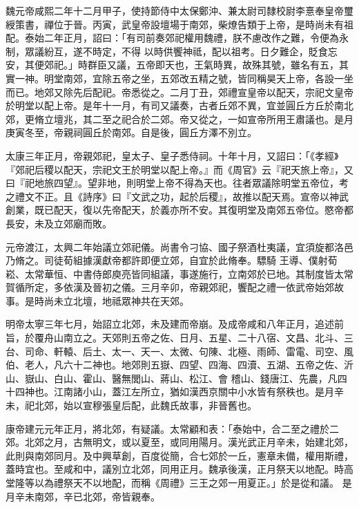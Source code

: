 \begin{pinyinscope}
 魏元帝咸熙二年十二月甲子，使持節侍中太保鄭沖、兼太尉司隸校尉李憙奉皇帝璽綬策書，禪位于晉。丙寅，武皇帝設壇場于南郊，柴燎告類于上帝，是時尚未有祖配。泰始二年正月，詔曰：「有司前奏郊祀權用魏禮，朕不慮改作之難，令便為永制，眾議紛互，遂不時定，不得
 以時供饗神祗，配以祖考。日夕難企，貶食忘安，其便郊祀。」時群臣又議，五帝即天也，王氣時異，故殊其號，雖名有五，其實一神。明堂南郊，宜除五帝之坐，五郊改五精之號，皆同稱昊天上帝，各設一坐而已。地郊又除先后配祀。帝悉從之。二月丁丑，郊禮宣皇帝以配天，宗祀文皇帝於明堂以配上帝。是年十一月，有司又議奏，古者丘郊不異，宜並圓丘方丘於南北郊，更脩立壇兆，其二至之祀合於二郊。帝又從之，一如宣帝所用王肅議也。是月庚寅冬至，帝親祠圓丘於南郊。自是後，圓丘方澤不別立。



 太康三年正月，帝親郊祀，皇太子、皇子悉侍祠。十年十月，又詔曰：「《孝經》『郊祀后稷以配天，宗祀文王於明堂以配上帝。』而《周官》云『祀天旅上帝』，又曰『祀地旅四望』。望非地，則明堂上帝不得為天也。往者眾議除明堂五帝位，考之禮文不正。且《詩序》曰『文武之功，起於后稷』，故推以配天焉。宣帝以神武創業，既已配天，復以先帝配天，於義亦所不安。其復明堂及南郊五帝位。愍帝都長安，未及立郊廟而敗。



 元帝渡江，太興二年始議立郊祀儀。尚書令刁協、國子祭酒杜夷議，宜須旋都洛邑乃脩之。司徒荀組據漢獻帝都許即便立郊，自宜於此脩奉。驃騎
 王導、僕射荀崧、太常華恒、中書侍郎庾亮皆同組議，事遂施行，立南郊於已地。其制度皆太常賀循所定，多依漢及晉初之儀。三月辛卯，帝親郊祀，饗配之禮一依武帝始郊故事。是時尚未立北壇，地祗眾神共在天郊。



 明帝太寧三年七月，始詔立北郊，未及建而帝崩。及成帝咸和八年正月，追述前旨，於覆舟山南立之。天郊則五帝之佐、日月、五星、二十八宿、文昌、北斗、三台、司命、軒轅、后土、太一、天一、太微、句陳、北極、雨師、雷電、司空、風伯、老人，凡六十二神也。地郊則五嶽、四望、四海、四瀆、五湖、五帝之佐、沂山、嶽山、白山、霍山、醫無閭山、蔣山、松江、會
 稽山、錢唐江、先農，凡四十四神也。江南諸小山，蓋江左所立，猶如漢西京關中小水皆有祭秩也。是月辛未，祀北郊，始以宣穆張皇后配，此魏氏故事，非晉舊也。



 康帝建元元年正月，將北郊，有疑議。太常顧和表：「泰始中，合二至之禮於二郊。北郊之月，古無明文，或以夏至，或同用陽月。漢光武正月辛未，始建北郊，此則與南郊同月。及中興草創，百度從簡，合七郊於一丘，憲章未備，權用斯禮，蓋時宜也。至咸和中，議別立北郊，同用正月。魏承後漢，正月祭天以地配。時高堂隆等以為禮祭天不以地配，而稱《周禮》三王之郊一用夏正。」於是從和議。
 是月辛未南郊，辛已北郊，帝皆親奉。




\end{pinyinscope}
